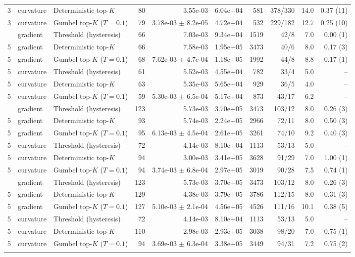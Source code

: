 \begin{tabular}{rllrrrrrrr}
3 & curvature & Deterministic top-$K$ & 80 & 3.55e-03 & 6.04e+04 & 581 & 378/330 & 14.0 & 0.37 (11) \\
3 & curvature & Gumbel top-$K$ ($T=0.1$) & 79 & 3.78e-03 $\pm$ 8.2e-05 & 4.72e+04 & 532 & 229/182 & 12.7 & 0.25 (10) \\
\addlinespace
5 & gradient & Threshold (hysteresis) & 66 & 7.03e-03 & 9.34e+04 & 1519 & 42/8 & 7.0 & 0.00 (1) \\
5 & gradient & Deterministic top-$K$ & 66 & 7.58e-03 & 1.95e+05 & 3473 & 40/6 & 8.0 & 0.17 (3) \\
5 & gradient & Gumbel top-$K$ ($T=0.1$) & 68 & 7.62e-03 $\pm$ 4.7e-04 & 1.18e+05 & 1992 & 44/8 & 8.8 & 0.17 (1) \\
5 & curvature & Threshold (hysteresis) & 61 & 5.52e-03 & 4.55e+04 & 782 & 33/4 & 5.0 & -- \\
5 & curvature & Deterministic top-$K$ & 63 & 5.35e-03 & 5.65e+04 & 929 & 36/5 & 4.0 & -- \\
5 & curvature & Gumbel top-$K$ ($T=0.1$) & 59 & 5.30e-03 $\pm$ 6.5e-04 & 5.17e+04 & 873 & 43/17 & 6.2 & -- \\
\addlinespace
5 & gradient & Threshold (hysteresis) & 123 & 5.73e-03 & 3.70e+05 & 3473 & 103/12 & 8.0 & 0.26 (3) \\
5 & gradient & Deterministic top-$K$ & 93 & 5.74e-03 & 2.24e+05 & 2966 & 72/11 & 8.0 & 0.50 (3) \\
5 & gradient & Gumbel top-$K$ ($T=0.1$) & 95 & 6.13e-03 $\pm$ 4.5e-04 & 2.61e+05 & 3261 & 74/10 & 9.2 & 0.40 (3) \\
5 & curvature & Threshold (hysteresis) & 72 & 4.14e-03 & 8.10e+04 & 1113 & 53/13 & 5.0 & -- \\
5 & curvature & Deterministic top-$K$ & 94 & 3.00e-03 & 3.41e+05 & 3628 & 91/29 & 7.0 & 1.00 (1) \\
5 & curvature & Gumbel top-$K$ ($T=0.1$) & 94 & 3.74e-03 $\pm$ 6.8e-04 & 2.97e+05 & 3019 & 90/28 & 7.5 & 0.74 (1) \\
\addlinespace
5 & gradient & Threshold (hysteresis) & 123 & 5.73e-03 & 3.70e+05 & 3473 & 103/12 & 8.0 & 0.26 (3) \\
5 & gradient & Deterministic top-$K$ & 129 & 4.38e-03 & 3.79e+05 & 3786 & 112/15 & 8.0 & 0.31 (3) \\
5 & gradient & Gumbel top-$K$ ($T=0.1$) & 127 & 5.10e-03 $\pm$ 2.1e-04 & 4.56e+05 & 4526 & 111/16 & 10.1 & 0.38 (5) \\
5 & curvature & Threshold (hysteresis) & 72 & 4.14e-03 & 8.10e+04 & 1113 & 53/13 & 5.0 & -- \\
5 & curvature & Deterministic top-$K$ & 110 & 2.98e-03 & 2.93e+05 & 3038 & 98/20 & 7.0 & 0.75 (1) \\
5 & curvature & Gumbel top-$K$ ($T=0.1$) & 94 & 3.69e-03 $\pm$ 6.3e-04 & 3.38e+05 & 3449 & 94/31 & 7.2 & 0.75 (2) \\
\addlinespace
\bottomrule
\end{tabular}

